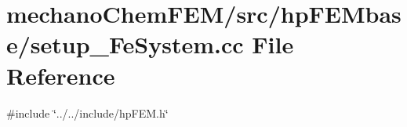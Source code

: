 \section{mechano\+Chem\+F\+E\+M/src/hp\+F\+E\+Mbase/setup\+\_\+\+Fe\+System.cc File Reference}
\label{setup___fe_system_8cc}
{\ttfamily \#include \char`\"{}../../include/hp\+F\+E\+M.\+h\char`\"{}}\newline
